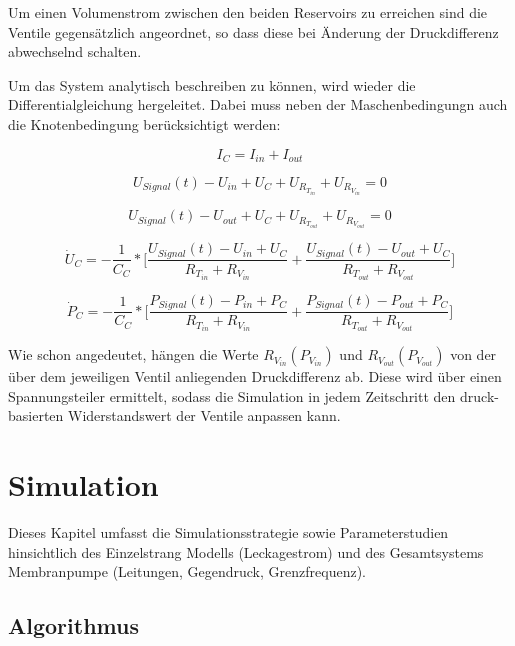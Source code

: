 \documentclass[fontsize=12pt, a4paper]{scrartcl}
\begin{document}
Um einen Volumenstrom zwischen den beiden Reservoirs zu erreichen sind die Ventile gegensätzlich angeordnet, so dass diese bei Änderung der Druckdifferenz abwechselnd schalten. 

Um das System analytisch beschreiben zu können, wird wieder die Differentialgleichung hergeleitet. Dabei muss neben der Maschenbedingungn auch die Knotenbedingung berücksichtigt werden:

\begin{equation}
	I_{C} = I_{in} + I_{out}
\end{equation}

\begin{equation}
	U_{Signal}(t) - U_{in} + U_{C} + U_{R_{T_{in}}} + U_{R_{V_{in}}} = 0
\end{equation}

\begin{equation}
	U_{Signal}(t) - U_{out} + U_{C} + U_{R_{T_{out}}} + U_{R_{V_{out}}} = 0
\end{equation}

\begin{equation}
	\dot{U}_{C} = - \frac{1}{C_{C}} * \biggl[\frac{U_{Signal}(t)-U_{in}+U_{C}}{R_{T_{in}}+R_{V_{in}}} + \frac{U_{Signal}(t)-U_{out}+U_{C}}{R_{T_{out}}+R_{V_{out}}}\biggr]
\end{equation}

\begin{equation}
	\dot{P}_{C} = - \frac{1}{C_{C}} * \biggl[\frac{P_{Signal}(t)-P_{in}+P_{C}}{R_{T_{in}}+R_{V_{in}}} + \frac{P_{Signal}(t)-P_{out}+P_{C}}{R_{T_{out}}+R_{V_{out}}}\biggr]
\end{equation}

Wie schon angedeutet, hängen die Werte $R_{V_{in}}(P_{V_{in}})$ und $R_{V_{out}}(P_{V_{out}})$ von der über dem jeweiligen Ventil anliegenden Druckdifferenz ab. Diese wird über einen Spannungsteiler ermittelt, sodass die Simulation in jedem Zeitschritt den druck-basierten Widerstandswert der Ventile anpassen kann.

\section{Simulation}

Dieses Kapitel umfasst die Simulationsstrategie sowie Parameterstudien hinsichtlich des Einzelstrang Modells (Leckagestrom) und des Gesamtsystems Membranpumpe (Leitungen, Gegendruck, Grenzfrequenz).

\subsection{Algorithmus}
\end{document}
